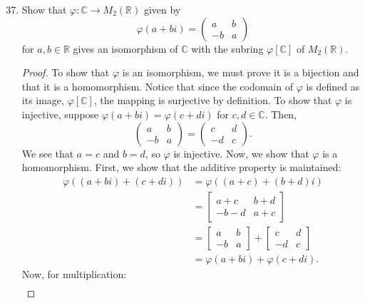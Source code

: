 \documentclass[12pt, oneside]{book}
\newcommand{\R}{\mathbb{R}}
\newcommand{\C}{\mathbb{C}}
\newcommand{\pf}[1]{
    \begin{customframedproof}[linecolor=orangehdx!75]
        \begin{proof}
        #1
        \end{proof}
    \end{customframedproof}
}
\begin{document}
\begin{enumerate}
    \setcounter{enumi}{36}   
    \item Show that \(\varphi : \C \to M_{2}(\R)\) given by
    \[
        \varphi(a + bi) = \begin{pmatrix}
            a & b \\
            -b & a
        \end{pmatrix}
    \]
    for \(a,b \in \R\) gives an isomorphism of \(\C\) with the subring \(\varphi[\C]\) of \(M_{2}(\R)\). 
    \pf{
        To show that \(\varphi\) is an isomorphism, we must prove it is a bijection and that it is a homomorphism. Notice that since the codomain of \(\varphi\) is defined as its image, \(\varphi[\C]\), the mapping is surjective by definition. To show that \(\varphi\) is injective, suppose \(\varphi(a + bi) = \varphi(c + di)\) for \(c,d \in \C\). Then, 
        \[
            \begin{pmatrix}
                a & b \\
                -b & a
            \end{pmatrix} = \begin{pmatrix}
                c & d \\
                -d & c
            \end{pmatrix}.
        \]
        We see that \(a = c\) and \(b = d\), so \(\varphi\) is injective. Now, we show that \(\varphi\) is a homomorphism. First, we show that the additive property is maintained:
        \begin{align*}
            \varphi((a + bi) + (c + di)) &=  \varphi((a + c) + (b + d)i) \\
            &= \begin{bmatrix}
                a + c & b + d \\
                - b - d & a + c
            \end{bmatrix} \\
            &= \begin{bmatrix}
                a & b \\
                - b & a 
            \end{bmatrix} + \begin{bmatrix}
                c & d \\
                - d & c 
            \end{bmatrix}\\
            &= \varphi(a + bi) + \varphi(c + di).
        \end{align*}
        Now, for multiplication:
        \begin{align*}

\end{align*}}
\end{enumerate}
\end{document}
